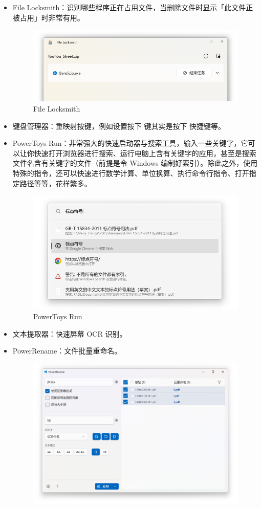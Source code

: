\begin{itemize}
\begin{figure}[htb!]
    \end{figure}
  \item File Locksmith：识别哪些程序正在占用文件，当删除文件时显示「此文件正被占用」时非常有用。
    \begin{figure}[htb!]
      \centering
      \includegraphics[width=.68\textwidth]{assets/software/File_Locksmith.png}
      \caption{File Locksmith}
      \label{fig:File_Locksmith}
    \end{figure}
  \item 键盘管理器：重映射按键，例如设置按下  键其实是按下  快捷键等。
  \item PowerToys Run：非常强大的快速启动器与搜索工具，输入一些关键字，它可以让你快速打开浏览器进行搜索、运行电脑上含有关键字的应用，甚至是搜索文件名含有关键字的文件（前提是令 Windows 编制好索引）。除此之外，使用特殊的指令，还可以快速进行数学计算、单位换算、执行命令行指令、打开指定路径等等，花样繁多。
    \begin{figure}[htb!]
      \centering
      \includegraphics[width=.75\textwidth]{assets/software/Powertoys_Run.png}
      \caption{PowerToys Run}
      \label{fig:PowerToys_Run}
    \end{figure}
  \item 文本提取器：快速屏幕 OCR 识别。
  \item PowerRename：文件批量重命名。
    \begin{figure}[htb!]
      \centering
      \includegraphics[width=.8\textwidth]{assets/software/PowerRename.png}

\end{figure}
\end{itemize}
